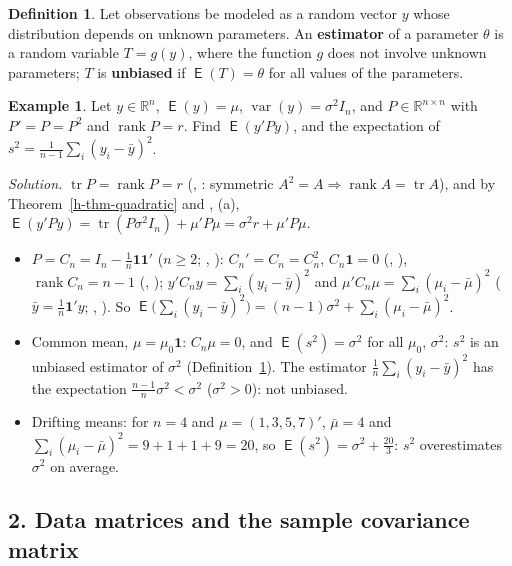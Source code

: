 \documentclass[12pt]{article}
\newcommand{\R}{\mathbb R}
\newcommand{\one}{\mathbf 1}
\DeclareMathOperator{\tr}{tr}
\DeclareMathOperator{\rank}{rank}
\DeclareMathOperator\expc{\mathsf{E}}
\DeclareMathOperator\var{var}
\theoremstyle{definition}
\newtheorem{definition}[theorem]{Definition}
\newtheorem{example}[theorem]{Example}
\begin{document}
\begin{definition}\label{h-def-estimator}
Let observations be modeled as a random vector \(y\) whose distribution depends on unknown parameters. An
\textbf{estimator} of a parameter \(\theta\) is a random variable \(T=g(y)\), where the function \(g\) does not involve
unknown parameters; \(T\) is \textbf{unbiased} if \(\expc(T)=\theta\) for all values of the parameters.
\end{definition}

\begin{example}\label{h-exm-quadratic}
Let \(y\in\R^n\), \(\expc(y)=\mu\), \(\var(y)=\sigma^2I_n\), and \(P\in\R^{n\times n}\) with
\(P'=P=P^2\) and \(\rank P=r\). Find \(\expc(y'Py)\), and the expectation of \(s^2=\frac1{n-1}\sum_i(y_i-\bar y)^2\).
\end{example}
\textit{Solution.} \(\tr P=\rank P=r\) (, : symmetric \(A^2=A\Rightarrow\rank A=\tr A\)), and by
Theorem~\ref{h-thm-quadratic} and , (a),
\(\expc(y'Py)=\tr(P\sigma^2I_n)+\mu'P\mu=\sigma^2r+\mu'P\mu\).
\begin{itemize}
\item \(P=C_n=I_n-\frac1n\one\one'\) (\(n\geqslant2\); , ): \(C_n'=C_n=C_n^2\), \(C_n\one=0\)
(, ), \(\rank C_n=n-1\) (, ); \(y'C_ny=\sum_i(y_i-\bar y)^2\) and
\(\mu'C_n\mu=\sum_i(\mu_i-\bar\mu)^2\) (\(\bar y=\frac1n\one'y\); , ). So
\(\expc\bigl(\sum_i(y_i-\bar y)^2\bigr)=(n-1)\sigma^2+\sum_i(\mu_i-\bar\mu)^2\).
\item Common mean, \(\mu=\mu_0\one\): \(C_n\mu=0\), and \(\expc(s^2)=\sigma^2\) for all \(\mu_0\), \(\sigma^2\):
\(s^2\) is an unbiased estimator of \(\sigma^2\) (Definition~\ref{h-def-estimator}). The estimator
\(\frac1n\sum_i(y_i-\bar y)^2\) has the expectation \(\frac{n-1}n\sigma^2<\sigma^2\) (\(\sigma^2>0\)): not unbiased.
\item Drifting means: for \(n=4\) and \(\mu=(1,3,5,7)'\), \(\bar\mu=4\) and \(\sum_i(\mu_i-\bar\mu)^2=9+1+1+9=20\), so
\(\expc(s^2)=\sigma^2+\frac{20}3\): \(s^2\) overestimates \(\sigma^2\) on average.
\end{itemize}

\subsection*{2. Data matrices and the sample covariance matrix}
\end{document}
